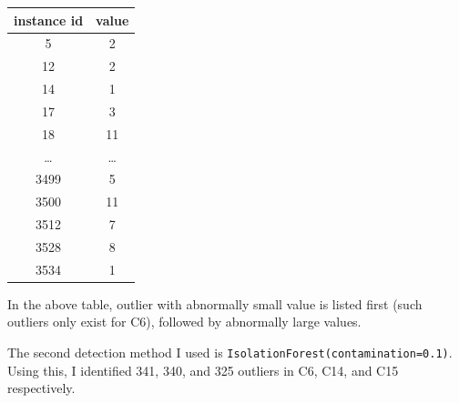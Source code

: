 \documentclass{article}
\begin{document}
\begin{description}
\begin{itemize}
\begin{center}
\begin{tabular}{|c|c|}
					\end{tabular}
					\hfill
					\begin{tabular}{|c|c|}
						\hline
						instance id & value \\
						\hline
						5       & 2 \\
						12      & 2 \\
						14      & 1 \\
						17      & 3 \\
						18      & 11 \\
						\ldots & \ldots\\
						3499    & 5 \\
						3500    & 11 \\
						3512    & 7 \\
						3528    & 8 \\
						3534    & 1 \\
						\hline
					\end{tabular}
				\end{center}
				In the above table, outlier with abnormally small value is listed first (such outliers only exist for C6), followed by abnormally large values.

				The second detection method I used is \texttt{IsolationForest(contamin\-ation=0.1)}. Using this, I identified 341, 340, and 325 outliers in C6, C14, and C15 respectively.


\end{itemize}
\end{description}
\end{document}
